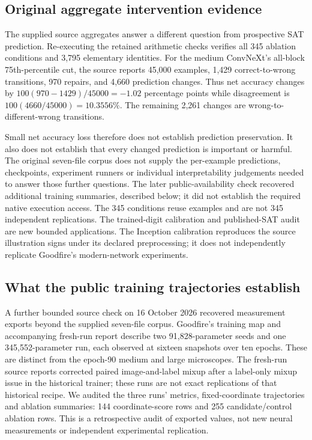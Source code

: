 \documentclass[
  british,
  11pt,
  a4paper,
]{article}
\begin{document}
\subsection{Original aggregate intervention
evidence}\label{original-aggregate-intervention-evidence}

The supplied source aggregates answer a different question from
prospective SAT prediction. Re-executing the retained arithmetic checks
verifies all 345 ablation conditions and 3,795 elementary identities.
For the medium ConvNeXt's all-block 75th-percentile cut, the source
reports 45,000 examples, 1,429 correct-to-wrong transitions, 970
repairs, and 4,660 prediction changes. Thus net accuracy changes by
\(100(970-1429)/45000=-1.02\) percentage points while disagreement is
\(100(4660/45000)=10.3556\%\). The remaining 2,261 changes are
wrong-to-different-wrong transitions.

Small net accuracy loss therefore does not establish prediction
preservation. It also does not establish that every changed prediction
is important or harmful. The original seven-file corpus does not supply
the per-example predictions, checkpoints, experiment runners or
individual interpretability judgements needed to answer those further
questions. The later public-availability check recovered additional
training summaries, described below; it did not establish the required
native execution access. The 345 conditions reuse examples and are not
345 independent replications. The trained-digit calibration and
published-SAT audit are new bounded applications. The Inception
calibration reproduces the source illustration signs under its declared
preprocessing; it does not independently replicate Goodfire's
modern-network experiments.

\subsection{What the public training trajectories
establish}\label{what-the-public-training-trajectories-establish}

A further bounded source check on 16 October 2026 recovered measurement
exports beyond the supplied seven-file corpus. Goodfire's training map
and accompanying fresh-run report describe two 91,828-parameter seeds
and one 345,552-parameter run, each observed at sixteen snapshots over
ten epochs. These are distinct from the epoch-90 medium and large
microscopes. The fresh-run source reports corrected paired
image-and-label mixup after a label-only mixup issue in the historical
trainer; these runs are not exact replications of that historical
recipe. We audited the three runs' metrics, fixed-coordinate
trajectories and ablation summaries: 144 coordinate-score rows and 255
candidate/control ablation rows. This is a retrospective audit of
exported values, not new neural measurements or independent experimental
replication.
\end{document}

